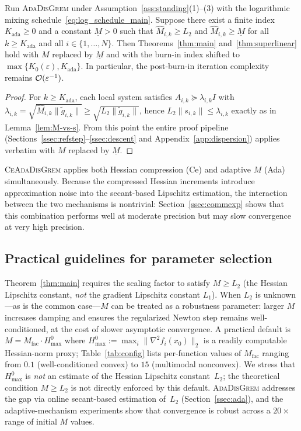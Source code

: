 \documentclass[review,onefignum,onetabnum]{siamart171218}
\begin{document}
	\begin{proposition}\label{prop:ada_cond}
	Run \textsc{AdaDisGrem} under Assumption~\ref{ass:standing}(1)--(3)
	with the logarithmic mixing schedule~\eqref{eq:log_schedule_main}.
	Suppose there exist a finite index $K_{\mathrm{ada}}\ge 0$ and a
	constant $\underline M>0$ such that
	$\hat M_{i,k}\ge L_2$ and $\hat M_{i,k}\ge \underline M$ for all
	$k\ge K_{\mathrm{ada}}$ and all $i\in\{1,\dots,N\}$.
	Then Theorems~\ref{thm:main} and~\ref{thm:superlinear} hold with
	$M$ replaced by $\underline M$ and with the burn-in index shifted
	to $\max\{K_0(\varepsilon),K_{\mathrm{ada}}\}$.
	In particular, the post-burn-in iteration complexity remains
	$\mathcal{O}(\varepsilon^{-1})$.
	\end{proposition}
	\begin{proof}
	For $k\ge K_{\mathrm{ada}}$, each local system satisfies
	$A_{i,k}\succeq \lambda_{i,k}I$ with
	$\lambda_{i,k}=\sqrt{\hat M_{i,k}\|\tilde g_{i,k}\|}
	\ge \sqrt{L_2\|\tilde g_{i,k}\|}$,
	hence $L_2\|s_{i,k}\|\le \lambda_{i,k}$ exactly as in
	Lemma~\ref{lem:M-vs-s}.
	From this point the entire proof pipeline
	(Sections~\ref{ssec:refstep}--\ref{ssec:descent} and
	Appendix~\ref{app:dispersion}) applies verbatim with $M$
	replaced by $\underline M$.
	\end{proof}
	
	\textsc{CeAdaDisGrem} applies both Hessian compression (Ce) and
	adaptive $M$ (Ada) simultaneously.
	Because the compressed Hessian increments introduce approximation noise
	into the secant-based Lipschitz estimation, the interaction between
	the two mechanisms is nontrivial: Section~\ref{ssec:commexp} shows
	that this combination performs well at moderate precision but may slow
	convergence at very high precision.
	
	\subsection{Practical guidelines for parameter selection}\label{ssec:practical}
	
	Theorem~\ref{thm:main} requires the scaling factor to satisfy $M\ge L_2$
	(the Hessian Lipschitz constant, \emph{not} the gradient Lipschitz
	constant $L_1$).
	When $L_2$ is unknown---as is the common case---$M$ can be treated
	as a robustness parameter: larger $M$ increases damping and ensures the
	regularized Newton step remains well-conditioned, at the cost of
	slower asymptotic convergence.
	A practical default is $M = M_{\mathrm{fac}} \cdot H_{\max}^{0}$ where
	$H_{\max}^{0} := \max_i\|\nabla^2 f_i(x_0)\|_2$ is a readily
	computable Hessian-norm proxy;
	Table~\ref{tab:config} lists per-function values of $M_{\mathrm{fac}}$
	ranging from $0.1$ (well-conditioned convex) to $15$ (multimodal nonconvex).
	We stress that $H_{\max}^{0}$ is \emph{not} an estimate of the Hessian
	Lipschitz constant~$L_2$; the theoretical condition $M\ge L_2$
	is not directly enforced by this default.
	\textsc{AdaDisGrem} addresses the gap via online secant-based
	estimation of~$L_2$ (Section~\ref{ssec:ada}), and the
	adaptive-mechanism experiments show that convergence is robust
	across a $20\times$ range of initial $M$ values.
\end{document}
